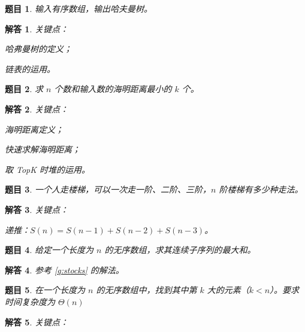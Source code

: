 \documentclass[UTF8, final]{ctexart}
\newtheorem{question}{题目}
\newtheorem{solution}{解答}
\begin{document}
\begin{question}
输入有序数组，输出哈夫曼树。
\end{question}
\begin{solution}
关键点：
\begin{compactitem}
    \item 哈弗曼树的定义；
    \item 链表的运用。
\end{compactitem}

\end{solution}

\begin{question}
求 $n$ 个数和输入数的海明距离最小的 $k$ 个。
\end{question}
\begin{solution}
关键点：
\begin{compactitem}
    \item 海明距离定义；
    \item 快速求解海明距离；
    \item 取 TopK 时堆的运用。
\end{compactitem}

\end{solution}

\begin{question}
一个人走楼梯，可以一次走一阶、二阶、三阶，$n$ 阶楼梯有多少种走法。
\end{question}
\begin{solution}
关键点：
\begin{compactitem}
    \item 递推：$S(n) = S(n - 1) + S(n - 2) + S(n - 3)$。
\end{compactitem}

\end{solution}

\begin{question}
给定一个长度为 $n$ 的无序数组，求其连续子序列的最大和。
\end{question}
\begin{solution}
参考 \ref{q:stocks} 的解法。
\end{solution}

\begin{question}
在一个长度为 $n$ 的无序数组中，找到其中第 $k$ 大的元素（$k < n$）。要求时间复杂度为 $\Theta(n)$
\end{question}
\begin{solution}
关键点：
\end{solution}
\end{document}

